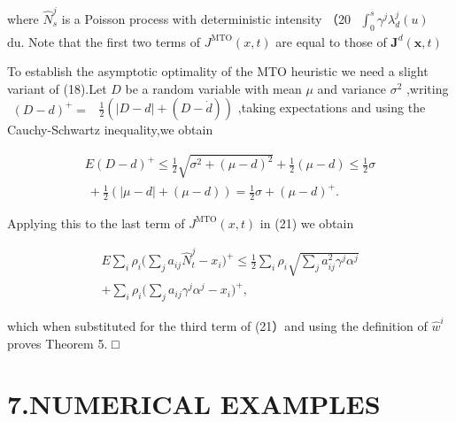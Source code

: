 where \(\hat { N } _ { s } ^ { j }\) is a Poisson process with
deterministic intensity （20
\(\begin{array} { r } { \int _ { 0 } ^ { s } \gamma ^ { j } \lambda _ { d } ^ { j } ( u ) } \end{array}\)
du. Note that the first two terms of
\(J ^ { \mathrm { M T O } } ( x , t )\) are equal to those of
\(\boldsymbol { J } ^ { d } ( \boldsymbol { x } , t )\)

To establish the asymptotic optimality of the MTO heuristic we need a
slight variant of (18).Let \(D\) be a random variable with mean \(\mu\)
and variance \(\sigma ^ { 2 }\) ,writing
\(\begin{array} { r } { ( D - d ) ^ { + } = } \end{array}\)
\({ \scriptstyle { \frac { 1 } { 2 } } } ( | D - d | + ( D - { \dot { d } } ) )\)
,taking expectations and using the Cauchy-Schwartz inequality,we obtain

\[
\begin{array} { l } { { \displaystyle E ( D - d ) ^ { + } \leqslant \frac { 1 } { 2 } \sqrt { \sigma ^ { 2 } + ( \mu - d ) ^ { 2 } } + \frac { 1 } { 2 } ( \mu - d ) \leqslant \frac { 1 } { 2 } \sigma } } \\ { { \displaystyle ~ + \frac { 1 } { 2 } ( | \mu - d | + ( \mu - d ) ) = \frac { 1 } { 2 } \sigma + ( \mu - d ) ^ { + } . } } \end{array}
\]

Applying this to the last term of
\(J ^ { \mathrm { M T O } } ( x , t )\) in (21) we obtain

\[
\begin{array} { l } { { \displaystyle E \sum _ { i } \rho _ { i } \Big ( \sum _ { j } a _ { i j } \hat { N } _ { t } ^ { j } - x _ { i } \Big ) ^ { + } \leqslant \frac { 1 } { 2 } \sum _ { i } \rho _ { i } \sqrt { \sum _ { j } a _ { i j } ^ { 2 } \gamma ^ { j } \alpha ^ { j } } } } \\ { { + \sum _ { i } \rho _ { i } \Big ( \sum _ { j } a _ { i j } \gamma ^ { j } \alpha ^ { j } - x _ { i } \Big ) ^ { + } , } } \end{array}
\]

which when substituted for the third term of (21）and using the
definition of \(\hat { w } ^ { i }\) proves Theorem 5. □

\section{7.NUMERICAL EXAMPLES}\label{numerical-examples}

